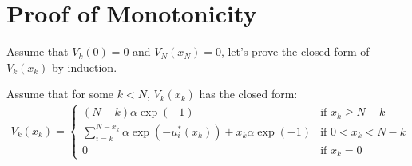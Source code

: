 \documentclass[11pt, a4paper, oneside]{memoir}
\begin{document}

\section{Proof of Monotonicity}
Assume that $V_k(0) = 0$ and $V_{N}(x_{N}) = 0$, let's prove the closed form of $V_k(x_k)$ by induction.

Assume that for some $k < N$, $V_k(x_k)$ has the closed form:
\begin{align*}
  V_k(x_k) =
  \begin{cases}
    (N-k)\alpha \exp(-1)                                              & \text{if } x_k \geq N-k  \\
    \sum_{i=k}^{N-x_k} \alpha \exp(-u_i^*(x_k)) + x_k \alpha \exp(-1) & \text{if } 0 < x_k < N-k \\
    0                                                                 & \text{if } x_k = 0
  \end{cases}
\end{align*}
\end{document}
